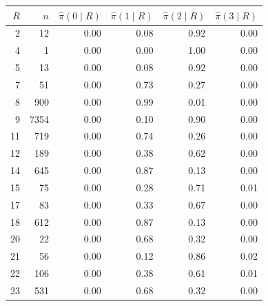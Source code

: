 \begin{tabular}{rrrrrr}
\toprule
$R$ & $n$ & $\hat\pi(0\mid R)$ & $\hat\pi(1\mid R)$ & $\hat\pi(2\mid R)$ & $\hat\pi(3\mid R)$ \\
\midrule
2 & 12 & 0.00 & 0.08 & 0.92 & 0.00 \\
4 & 1 & 0.00 & 0.00 & 1.00 & 0.00 \\
5 & 13 & 0.00 & 0.08 & 0.92 & 0.00 \\
7 & 51 & 0.00 & 0.73 & 0.27 & 0.00 \\
8 & 900 & 0.00 & 0.99 & 0.01 & 0.00 \\
9 & 7354 & 0.00 & 0.10 & 0.90 & 0.00 \\
11 & 719 & 0.00 & 0.74 & 0.26 & 0.00 \\
12 & 189 & 0.00 & 0.38 & 0.62 & 0.00 \\
14 & 645 & 0.00 & 0.87 & 0.13 & 0.00 \\
15 & 75 & 0.00 & 0.28 & 0.71 & 0.01 \\
17 & 83 & 0.00 & 0.33 & 0.67 & 0.00 \\
18 & 612 & 0.00 & 0.87 & 0.13 & 0.00 \\
20 & 22 & 0.00 & 0.68 & 0.32 & 0.00 \\
21 & 56 & 0.00 & 0.12 & 0.86 & 0.02 \\
22 & 106 & 0.00 & 0.38 & 0.61 & 0.01 \\
23 & 531 & 0.00 & 0.68 & 0.32 & 0.00 \\
\bottomrule
\end{tabular}
